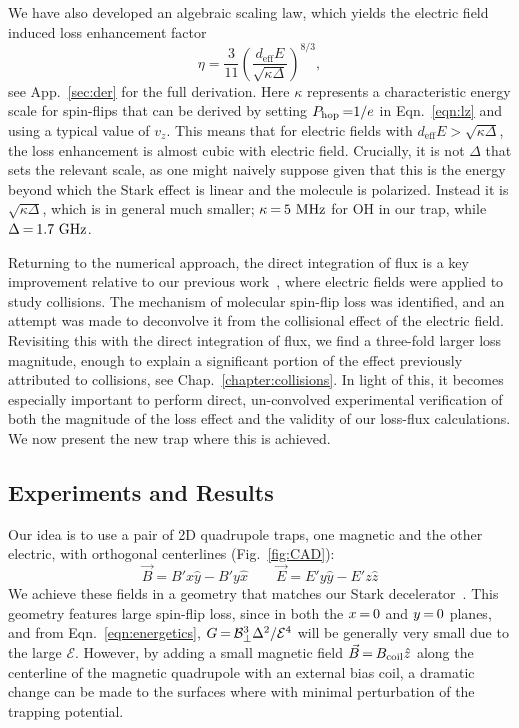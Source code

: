 We have also developed an algebraic scaling law, which yields the electric field induced loss enhancement factor
\begin{equation}
\label{eq:etaMT}
\eta=\frac{3}{11} \left(\frac{d_\text{eff}E}{\sqrt{\kappa\Delta}}\right)^{8/3},
\end{equation}
see App.~\ref{sec:der} for the full derivation.
Here $\kappa$ represents a characteristic energy scale for spin-flips that can be derived by setting $P_\text{hop}{\nobreak\hspace{.2em}} {=}1/e$ in Eqn.~\ref{eqn:lz} and using a typical value of $v_z$.
This means that for electric fields with $d_\text{eff}E>\sqrt{\kappa\Delta}$, the loss enhancement is almost cubic with electric field.
Crucially, it is not $\Delta$ that sets the relevant scale, as one might naively suppose given that this is the energy beyond which the Stark effect is linear and the molecule is polarized.
Instead it is $\sqrt{\kappa\Delta}$, which is in general much smaller; $\kappa{\nobreak\hspace{.2em}} {=}{\nobreak\hspace{.2em}} 5\text{ MHz}$ for OH in our trap, while $\Delta{\nobreak\hspace{.2em}} {=}{\nobreak\hspace{.2em}}1.7\text{ GHz}$.

Returning to the numerical approach, the direct integration of flux is a key improvement relative to our previous work~\cite{Stuhl2013}, where electric fields were applied to study collisions.
The mechanism of molecular spin-flip loss was identified, and an attempt was made to deconvolve it from the collisional effect of the electric field.
Revisiting this with the direct integration of flux, we find a three-fold larger loss magnitude, enough to explain a significant portion of the effect previously attributed to collisions, see Chap.~\ref{chapter:collisions}.
In light of this, it becomes especially important to perform direct, un-convolved experimental verification of both the magnitude of the loss effect and the validity of our loss-flux calculations.
We now present the new trap where this is achieved.


\subsection{Experiments and Results\label{sec:results}}

Our idea is to use a pair of 2D quadrupole traps, one magnetic and the other electric, with orthogonal centerlines (Fig.~\ref{fig:CAD}):
\begin{equation}
\label{eqn:BE}
\vec{B}=B'x\hat{y}-B'y\hat{x}\quad\quad\vec{E}=E'y\hat{y}-E'z\hat{z}
\end{equation}
We achieve these fields in a geometry that matches our Stark decelerator~\cite{Bochinski2003}.
This geometry features large spin-flip loss, since \epb{} in both the $x{\nobreak\hspace{.2em}} {=}{\nobreak\hspace{.2em}} 0$ and $y{\nobreak\hspace{.2em}} {=}{\nobreak\hspace{.2em}} 0$ planes, and from Eqn.~\ref{eqn:energetics}, $G{\nobreak\hspace{.2em}} {=} {\nobreak\hspace{.2em}} \mathcal{B}_\perp^3\Delta^2/\mathcal{E}^4$ will be generally very small due to the large $\mathcal{E}$.
However, by adding a small magnetic field $\vec{B}{\nobreak\hspace{.2em}} {=}{\nobreak\hspace{.2em}} B_\text{coil}\hat{z}$ along the centerline of the magnetic quadrupole with an external bias coil, a dramatic change can be made to the surfaces where \epb{} with minimal perturbation of the trapping potential.

